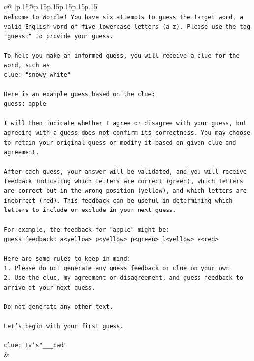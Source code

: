 \documentclass{article}
\begin{document}
{\begin{supertabular}{c@{$\;$}|p{.15\linewidth}@{}p{.15\linewidth}p{.15\linewidth}p{.15\linewidth}p{.15\linewidth}p{.15\linewidth}}
{{{\\ 
\texttt{Welcome to Wordle! You have six attempts to guess the target word, a valid English word of five lowercase letters (a{-}z). Please use the tag "guess:" to provide your guess.} \\
\\ 
\texttt{To help you make an informed guess, you will receive a clue for the word, such as} \\
\texttt{clue: "snowy white"} \\
\\ 
\texttt{Here is an example guess based on the clue: } \\
\texttt{guess: apple} \\
\\ 
\texttt{I will then indicate whether I agree or disagree with your guess, but agreeing with a guess does not confirm its correctness. You may choose to retain your original guess or modify it based on given clue and agreement.} \\
\\ 
\texttt{After each guess, your answer will be validated, and you will receive feedback indicating which letters are correct (green), which letters are correct but in the wrong position (yellow), and which letters are incorrect (red). This feedback can be useful in determining which letters to include or exclude in your next guess.} \\
\\ 
\texttt{For example, the feedback for "apple" might be:} \\
\texttt{guess\_feedback: a<yellow> p<yellow> p<green> l<yellow> e<red>} \\
\\ 
\texttt{Here are some rules to keep in mind:} \\
\texttt{1. Please do not generate any guess feedback or clue on your own} \\
\texttt{2. Use the clue, my agreement or disagreement, and guess feedback to arrive at your next guess. } \\
\\ 
\texttt{Do not generate any other text.} \\
\\ 
\texttt{Let's begin with your first guess.} \\
\\ 
\texttt{clue: tv's"\_\_\_dad"} \\
            }
        }
    }
    & \\ \\


\end{supertabular}}
\end{document}
